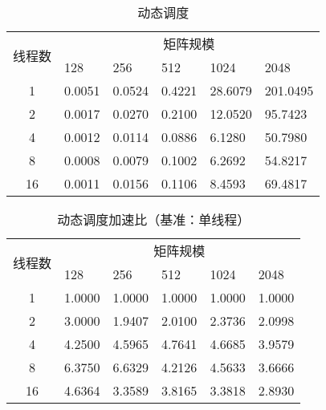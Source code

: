 \documentclass{SYSUReport}
\begin{document}
\begin{table}[H]
\centering
\caption{动态调度}
\label{表3}
\begin{tabular}{|c|lllll|}
\hline
\multirow{2}{*}{线程数} & \multicolumn{5}{c|}{矩阵规模}                                                                        \\ \cline{2-6} 
 & \multicolumn{1}{l|}{128} & \multicolumn{1}{l|}{256} & \multicolumn{1}{l|}{512} & \multicolumn{1}{l|}{1024} & 2048 \\ \hline
1                    & \multicolumn{1}{l|}{0.0051} & \multicolumn{1}{l|}{0.0524} & \multicolumn{1}{l|}{0.4221} & \multicolumn{1}{l|}{28.6079} &201.0495  \\ \hline
2                    & \multicolumn{1}{l|}{0.0017} & \multicolumn{1}{l|}{0.0270} & \multicolumn{1}{l|}{0.2100} & \multicolumn{1}{l|}{12.0520 } &95.7423  \\ \hline
4                    & \multicolumn{1}{l|}{0.0012} & \multicolumn{1}{l|}{0.0114} & \multicolumn{1}{l|}{0.0886} & \multicolumn{1}{l|}{6.1280} &50.7980  \\ \hline
8                    & \multicolumn{1}{l|}{0.0008} & \multicolumn{1}{l|}{0.0079} & \multicolumn{1}{l|}{0.1002} & \multicolumn{1}{l|}{6.2692} &54.8217  \\ \hline
16                   & \multicolumn{1}{l|}{0.0011} & \multicolumn{1}{l|}{0.0156 } & \multicolumn{1}{l|}{0.1106} & \multicolumn{1}{l|}{8.4593} &69.4817  \\ \hline
\end{tabular}
\end{table}
\begin{table}[H]
    \centering
    \caption{动态调度加速比（基准：单线程）}
    \label{表4}
    \begin{tabular}{|c|lllll|}
    \hline
    \multirow{2}{*}{线程数} & \multicolumn{5}{c|}{矩阵规模} \\ \cline{2-6} 
     & \multicolumn{1}{l|}{128} & \multicolumn{1}{l|}{256} & \multicolumn{1}{l|}{512} & \multicolumn{1}{l|}{1024} & 2048 \\ \hline
    1  & \multicolumn{1}{l|}{1.0000} & \multicolumn{1}{l|}{1.0000} & \multicolumn{1}{l|}{1.0000} & \multicolumn{1}{l|}{1.0000} & 1.0000 \\ \hline
    2  & \multicolumn{1}{l|}{3.0000} & \multicolumn{1}{l|}{1.9407} & \multicolumn{1}{l|}{2.0100} & \multicolumn{1}{l|}{2.3736} & 2.0998 \\ \hline
    4  & \multicolumn{1}{l|}{4.2500} & \multicolumn{1}{l|}{4.5965} & \multicolumn{1}{l|}{4.7641} & \multicolumn{1}{l|}{4.6685} & 3.9579 \\ \hline
    8  & \multicolumn{1}{l|}{6.3750} & \multicolumn{1}{l|}{6.6329} & \multicolumn{1}{l|}{4.2126} & \multicolumn{1}{l|}{4.5633} & 3.6666 \\ \hline
    16 & \multicolumn{1}{l|}{4.6364} & \multicolumn{1}{l|}{3.3589} & \multicolumn{1}{l|}{3.8165} & \multicolumn{1}{l|}{3.3818} & 2.8930 \\ \hline
    \end{tabular}
    \end{table}
\end{document}
